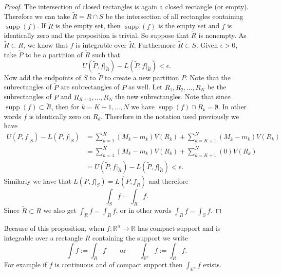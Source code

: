\documentclass[12pt]{book}
\newcommand{\R}{{\mathbb{R}}}
\theoremstyle{plain}
\theoremstyle{remark}
\theoremstyle{definition}
\theoremstyle{exercise}
\theoremstyle{example}
\begin{document}
\begin{proof}
The intersection of closed rectangles is again a closed rectangle (or empty).  Therefore
we can take $\widetilde{R} = R \cap S$ be the intersection of all rectangles containing
$\operatorname{supp}(f)$.  If $\widetilde{R}$ is the empty set, then
$\operatorname{supp}(f)$ is the empty set and $f$ is identically zero
and the proposition is trivial.  So suppose that $\widetilde{R}$ is nonempty.
As $\widetilde{R} \subset R$, we know that $f$ is integrable over
$\widetilde{R}$.
Furthermore $\widetilde{R} \subset S$.
Given $\epsilon > 0$, take $\widetilde{P}$ to be a partition of $\widetilde{R}$
such that
\begin{equation*}
U(\widetilde{P},f|_{\widetilde{R}})-
L(\widetilde{P},f|_{\widetilde{R}}) < \epsilon .
\end{equation*}
Now add the endpoints of $S$ to $\widetilde{P}$ to create a new partition $P$.
Note that the subrectangles of $\widetilde{P}$ are subrectangles of $P$ as well.
Let $R_1,R_2,\ldots,R_K$ be the subrectangles of $\widetilde{P}$
and $R_{K+1},\ldots,R_N$ the new subrectangles.  Note that since
$\operatorname{supp}(f) \subset \widetilde{R}$, then 
for $k=K+1,\ldots,N$ we have $\operatorname{supp}(f) \cap R_k = \emptyset$.
In other words $f$ is identically zero on $R_k$.  Therefore in the notation
used previously we have
\begin{equation*}
\begin{split}
U(P,f|_S)-L(P,f|_S) & =
\sum_{k=1}^K (M_k-m_k) V(R_k)
+
\sum_{k=K+1}^N (M_k-m_k) V(R_k)
\\
& =
\sum_{k=1}^K (M_k-m_k) V(R_k)
+
\sum_{k=K+1}^N (0) V(R_k)
\\
& =
U(\widetilde{P},f|_{\widetilde{R}})-
L(\widetilde{P},f|_{\widetilde{R}}) < \epsilon .
\end{split}
\end{equation*}
Similarly we have that
$L(P,f|_S) = L(\widetilde{P},f_{\widetilde{R}})$
and therefore
\begin{equation*}
\int_S f = \int_{\widetilde{R}} f.
\end{equation*}
Since $\widetilde{R} \subset R$ we also get $\int_R f = \int_{\widetilde{R}} f$,
or in other words $\int_R f = \int_S f$.
\end{proof}


Because of this proposition, when $f \colon \R^n \to \R$ has compact support
and is integrable over a rectangle $R$ containing the support we write
\begin{equation*}
\int f := \int_R f \qquad \text{or} \qquad 
\int_{\R^n} f := \int_R f .
\end{equation*}
For example if $f$ is continuous and of compact support then
$\int_{\R^n} f$ exists.
\end{document}
